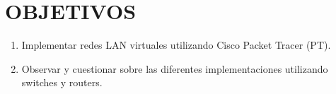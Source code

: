 \chapter{OBJETIVOS}

\begin{caja}[]
\begin{enumerate}[label=\itembolasazules{}]
\item Implementar redes LAN virtuales utilizando Cisco Packet Tracer
(PT).
\item Observar y cuestionar sobre las diferentes implementaciones
utilizando switches y routers.
\end{enumerate}
\end{caja}


